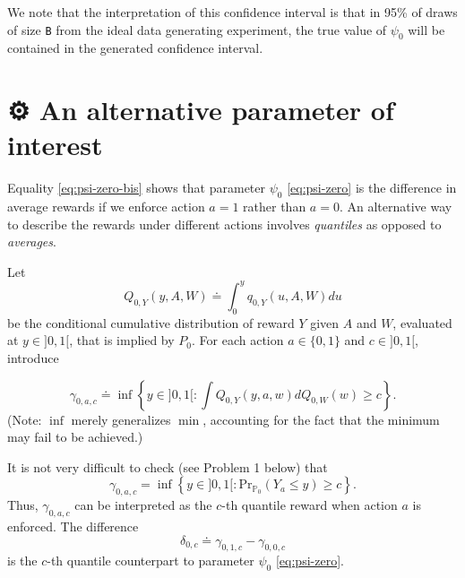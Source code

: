 \documentclass[11pt,openright,twoside]{book}
\newcommand{\gear}{\usebox{\gearbox}\;}
\newcommand{\bbP}{\mathbb{P}}
\newcommand{\defq}{\doteq}
\renewcommand{\Pr}{\textrm{Pr}}
\theoremstyle{definition}
\theoremstyle{definition}
\theoremstyle{definition}
\theoremstyle{remark}
\begin{document}
We note that the interpretation of this confidence interval is that in 95\% of
draws of size \texttt{B} from the ideal data generating experiment, the true value of
\(\psi_0\) will be contained in the generated confidence interval.

\hypertarget{exo-alternative-parameter-first-pass}{%
\section{\texorpdfstring{⚙ \gear An alternative parameter of interest}{⚙ An alternative parameter of interest}}\label{exo-alternative-parameter-first-pass}}

Equality \eqref{eq:psi-zero-bis} shows that parameter \(\psi_0\)
\eqref{eq:psi-zero} is the difference in average rewards if we enforce action
\(a = 1\) rather than \(a = 0\). An alternative way to describe the rewards under
different actions involves \emph{quantiles} as opposed to \emph{averages}.

Let \begin{equation*} Q_{0,Y}(y,  A, W) \defq \int_{0}^y q_{0,Y}(u,  A, W) du
\end{equation*} be the conditional cumulative distribution of reward \(Y\) given
\(A\) and \(W\), evaluated at \(y \in ]0,1[\), that is implied by \(P_0\). For each
action \(a \in \{0,1\}\) and \(c \in ]0,1[\), introduce

\begin{equation}
\gamma_{0,a,c}  \defq  \inf  \left\{y  \in  ]0,1[ :  \int  Q_{0,Y}(y,  a,  w)
dQ_{0,W}(w) \ge c \right\}. \label{eq:def-quantile}
\end{equation}
(Note: \(\inf\) merely generalizes \(\min\), accounting for the fact that the
minimum may fail to be achieved.)

It is not very difficult to check (see Problem 1 below) that
\begin{equation}\gamma_{0,a,c} =  \inf\left\{y \in ]0,1[  : \Pr_{\bbP_{0}}(Y_a
\leq   y)   \geq   c\right\}.    \label{eq:alter-gamma-zero}\end{equation} Thus,
\(\gamma_{0,a,c}\) can be interpreted as the \(c\)-th quantile
reward when action \(a\) is enforced. The difference
\begin{equation}\delta_{0,c}    \defq    \gamma_{0,1,c}   -    \gamma_{0,0,c}
\label{eq:def-delta}\end{equation} is the \(c\)-th quantile counterpart to parameter
\(\psi_{0}\) \eqref{eq:psi-zero}.
\end{document}
